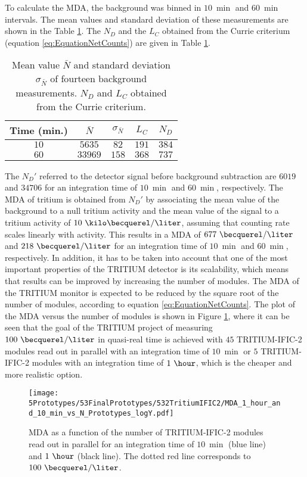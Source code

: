 To calculate the MDA, the background was binned in $10~\min$ and $60~\min$ intervals. The mean values and standard deviation of these measurements are shown in the Table \ref{tab:CurrieLawTRITIUMIFIC2}. The $N_D$ and the $L_C$ obtained from the Currie criterium (equation \ref{eq:EquationNetCounts}) are given in Table \ref{tab:CurrieLawTRITIUMIFIC2}.
\begin{table}[htbp]
\centering{}%
\begin{tabular}{ccccc}
\toprule 
Time (min.) & $\bar{N}$ & $\sigma_{\bar{N}}$ & $L_C$ & $N_D$ \tabularnewline
\midrule
\midrule 
$10$ & $5635$ & $82$ & $191$ & $384$ \tabularnewline
$60$ & $33969$ & $158$ & $368$ & $737$ \tabularnewline
\bottomrule
\end{tabular}
\caption{Mean value $\bar{N}$ and standard deviation $\sigma_{\bar{N}}$ of fourteen background measurements. $N_D$ and $L_C$ obtained from the Currie criterium.}
\label{tab:CurrieLawTRITIUMIFIC2}
\end{table}
The $N_D'$ referred to the detector signal before background subtraction are $6019$ and $34706$ for an integration time of $10~\min$ and $60~\min$, respectively. The MDA of tritium is obtained from $N_D'$ by associating the mean value of the background to a null tritium activity and the mean value of the signal to a tritium activity of $10~\kilo\becquerel/\liter$, assuming that counting rate scales linearly with activity. This results in a MDA of $677~\becquerel/\liter$ and $218~\becquerel/\liter$ for an integration time of $10~\min$ and $60~\min$, respectively. In addition, it has to be taken into account that one of the most important properties of the TRITIUM detector is its scalability, which means that results can be improved by increasing the number of modules. The MDA of the TRITIUM monitor is expected to be reduced by the square root of the number of modules, according to equation \ref{eq:EquationNetCounts}. The plot of the MDA versus the number of modules is shown in Figure \ref{fig:MDATRITIUMmonitor}, where it can be seen that the goal of the TRITIUM project of measuring $100~\becquerel/\liter$ in quasi-real time is achieved with $45$ TRITIUM-IFIC-2 modules read out in parallel with an integration time of $10~\min$ or $5$ TRITIUM-IFIC-2 modules with an integration time of $1~\hour$, which is the cheaper and more realistic option. %

\begin{figure}[h]
\centering
\texttt{[image: 5Prototypes/53FinalPrototypes/532TritiumIFIC2/MDA\_1\_hour\_and\_10\_min\_vs\_N\_Prototypes\_logY.pdf]}
\caption{MDA as a function of the number of TRITIUM-IFIC-2 modules read out in parallel for an integration time of $10~\min$ (blue line) and $1~\hour$ (black line). The dotted red line corresponds to $100~\becquerel/\liter$. \label{fig:MDATRITIUMmonitor}}
\end{figure}


